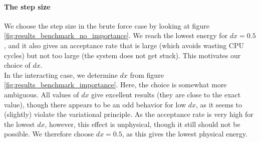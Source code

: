 \documentclass[a4paper, 10pt]{article}
\begin{document}
\paragraph{The step size}
We choose the step size in the brute force case by looking at figure \ref{fig:results_benchmark_no_importance}. We reach the lowest energy for $dx=0.5$, and it also gives an acceptance rate that is large (which avoids wasting CPU cycles) but not too large (the system does not get stuck). This motivates our choice of $dx$.\\
\linebreak
In the interacting case, we determine $dx$ from figure \ref{fig:results_benchmark_importance}. Here, the choice is somewhat more ambiguous. All values of $dx$ give excellent results (they are close to the exact value), though there appears to be an odd behavior for low $dx$, as it seems to (slightly) violate the variational principle. As the acceptance rate is very high for the lowest $dx$, however, this effect is unphysical, though it still should not be possible. We therefore choose $dx=0.5$, as this gives the lowest physical energy.\\
\linebreak
\end{document}
